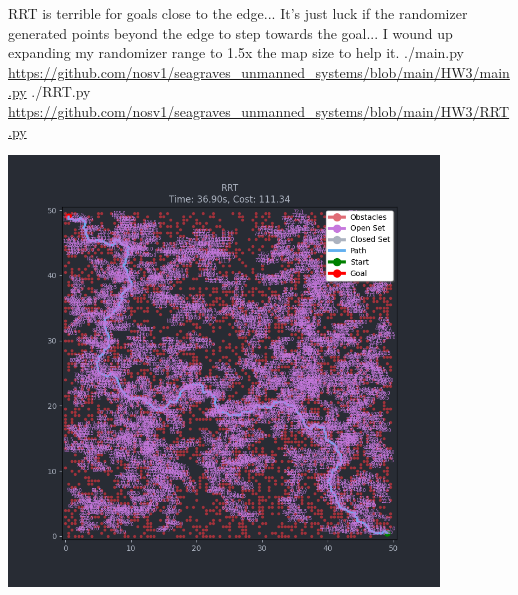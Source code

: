 \documentclass{article}
\begin{document}
\begin{minipage}{\linewidth}
                RRT is terrible for goals close to the edge... It's just luck if the randomizer generated points beyond the edge to step towards the goal... I wound up expanding my randomizer range to 1.5x the map size to help it.
                \break
                ./main.py \break
                \url{https://github.com/nosv1/seagraves_unmanned_systems/blob/main/HW3/main.py} \break
                ./RRT.py \break
                \url{https://github.com/nosv1/seagraves_unmanned_systems/blob/main/HW3/RRT.py}
                \begin{center}
                    \includegraphics[height=4.5in]{HW3P3 RRT.png}
                \end{center}
            \end{minipage}
\end{document}
